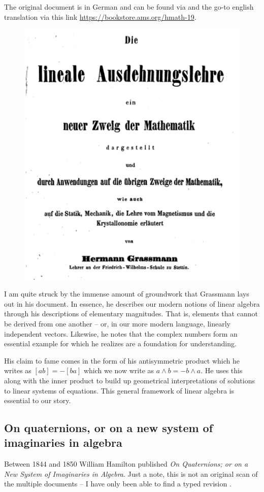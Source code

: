 \documentclass[12pt]{article}
\begin{document}
The original document is in German and can be found via \cite{grassmann_lineale_1844} and the go-to english translation via this link \url{https://bookstore.ams.org/hmath-19}. 
\begin{figure}[H]
    \centering
    \includegraphics[width=.6\textwidth]{figures/grassmann_title.png}
\end{figure}

I am quite struck by the immense amount of groundwork that Grassmann lays out in his document. In essence, he describes our modern notions of linear algebra through his descriptions of elementary magnitudes. That is, elements that cannot be derived from one another -- or, in our more modern language, linearly independent vectors. Likewise, he notes that the complex numbers form an essential example for which he realizes are a foundation for understanding.

His claim to fame comes in the form of his antisymmetric product which he writes as $[ab]=-[ba]$ which we now write as $a\wedge b = - b \wedge a$. He uses this along with the inner product to build up geometrical interpretations of solutions to linear systems of equations. This general framework of linear algebra is essential to our story.

\newpage
\subsection{On quaternions, or on a new system of imaginaries in algebra}

Between 1844 and 1850 William Hamilton published \emph{On Quaternions; or on a New System of Imaginaries in Algebra}. Just a note, this is not an original scan of the multiple documents -- I have only been able to find a typed revision \cite{hamilton_quaternions_nodate}.  
\end{document}
